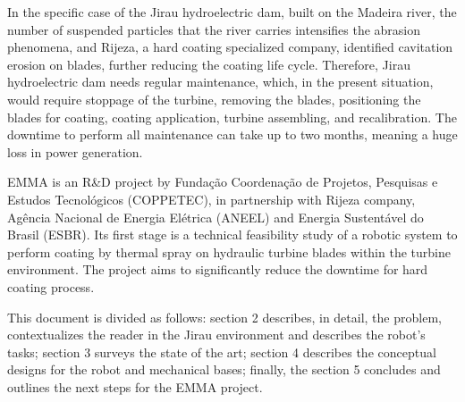 In the specific case of the Jirau hydroelectric dam, built on the Madeira
river, the number of suspended particles that the river carries intensifies the
abrasion phenomena, and Rijeza, a hard coating specialized company, identified cavitation erosion on blades, further reducing the coating life cycle.
Therefore, Jirau hydroelectric dam needs regular maintenance, which,
in the present situation, would require stoppage of the turbine, removing the
blades, positioning the blades for coating, coating application, turbine assembling, and recalibration. The downtime to perform all
maintenance can take up to two months, meaning a huge loss in power generation.

EMMA is an R\&D project by Fundação Coordenação de Projetos, Pesquisas e Estudos
Tecnológicos (COPPETEC), in partnership with Rijeza company, Agência Nacional de
Energia Elétrica (ANEEL) and Energia Sustentável do Brasil (ESBR). Its first
stage is a technical feasibility study of a robotic system to perform
coating by thermal spray on hydraulic turbine blades within the turbine
environment. The project aims to significantly reduce the downtime for hard
coating process.

This document is divided as follows: section 2 describes, in detail, the
problem, contextualizes the reader in the Jirau environment and
describes the robot's tasks; section 3 surveys the state of the
art; section 4 describes the conceptual designs for the robot and mechanical
bases; finally, the section 5 concludes and outlines the next steps for the
EMMA project. 
